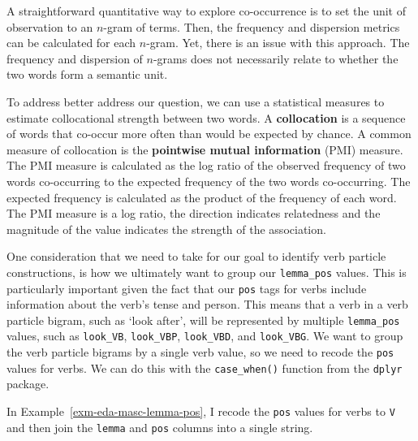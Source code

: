 \documentclass[
  letterpaper,
]{latex/krantz}
\theoremstyle{definition}
\theoremstyle{remark}
\begin{document}
A straightforward quantitative way to explore co-occurrence is to set
the unit of observation to an \(n\)-gram of terms. Then, the frequency
and dispersion metrics can be calculated for each \(n\)-gram. Yet, there
is an issue with this approach. The frequency and dispersion of
\(n\)-grams does not necessarily relate to whether the two words form a
semantic unit.

To address better address our question, we can use a statistical
measures to estimate collocational strength between two words. A
\textbf{collocation} is a sequence of words that co-occur more often
than would be expected by chance. A common measure of collocation is the
\textbf{pointwise mutual information} (PMI) measure. The PMI measure is
calculated as the log ratio of the observed frequency of two words
co-occurring to the expected frequency of the two words co-occurring.
The expected frequency is calculated as the product of the frequency of
each word. The PMI measure is a log ratio, the direction indicates
relatedness and the magnitude of the value indicates the strength of the
association.

One consideration that we need to take for our goal to identify verb
particle constructions, is how we ultimately want to group our
\texttt{lemma\_pos} values. This is particularly important given the
fact that our \texttt{pos} tags for verbs include information about the
verb's tense and person. This means that a verb in a verb particle
bigram, such as `look after', will be represented by multiple
\texttt{lemma\_pos} values, such as \texttt{look\_VB},
\texttt{look\_VBP}, \texttt{look\_VBD}, and \texttt{look\_VBG}. We want
to group the verb particle bigrams by a single verb value, so we need to
recode the \texttt{pos} values for verbs. We can do this with the
\texttt{case\_when()} function from the \texttt{dplyr} package.

In Example~\ref{exm-eda-masc-lemma-pos}, I recode the \texttt{pos}
values for verbs to \texttt{V} and then join the \texttt{lemma} and
\texttt{pos} columns into a single string.
\end{document}
